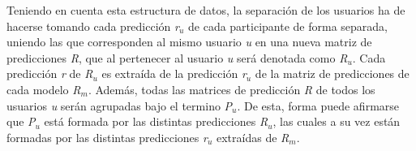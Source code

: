 Teniendo en cuenta esta estructura de datos, la separación de los usuarios ha de hacerse tomando cada predicción \textit{r$_{u}$} de cada participante de forma separada, uniendo las que corresponden al mismo usuario \textit{u} en una nueva matriz de predicciones \textit{R}, que al pertenecer al usuario \textit{u} será denotada como \textit{R$_{u}$}. Cada predicción \textit{r} de \textit{R$_{u}$} es extraída de la predicción \textit{r$_{u}$} de la matriz de predicciones de cada modelo \textit{R$_{m}$}. Además, todas las matrices de predicción \textit{R} de todos los usuarios \textit{u} serán agrupadas bajo el termino \textit{P$_{u}$}. De esta, forma puede afirmarse que \textit{P$_{u}$} está formada por las distintas predicciones \textit{R$_{u}$}, las cuales a su vez están formadas por las distintas predicciones \textit{r$_{u}$} extraídas de \textit{R$_{m}$}.

